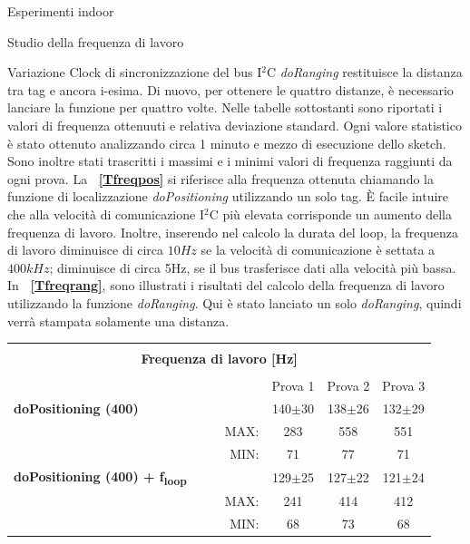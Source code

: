 \documentclass[12pt]{report}
\begin{document}
\begin{section}{Esperimenti indoor}
\begin{subsection}{Studio della frequenza di lavoro}
\begin{subsubsection}{Variazione Clock di sincronizzazione del bus I$^2$C}
			\textit{doRanging} restituisce la distanza tra tag e ancora i-esima. Di nuovo, per ottenere le quattro distanze, è necessario lanciare la funzione per quattro volte. 
			Nelle tabelle sottostanti sono riportati i valori di frequenza ottenuuti e relativa deviazione standard. Ogni valore statistico è stato ottenuto analizzando circa 1 minuto e mezzo di esecuzione dello sketch. Sono inoltre stati trascritti i massimi e i minimi valori di frequenza raggiunti da ogni prova.
			La \textbf{\tablename~\ref{Tfreqpos}} si riferisce alla frequenza ottenuta chiamando la funzione di localizzazione \textit{doPositioning} utilizzando un solo tag. È facile intuire che alla velocità di comunicazione I$^2$C più elevata corrisponde un aumento della frequenza di lavoro. Inoltre, inserendo nel calcolo la 			durata del loop, la frequenza di lavoro diminuisce di circa $10Hz$  se la velocità di comunicazione è settata a $400kHz$; diminuisce di circa 5Hz, se il bus trasferisce dati alla velocità più bassa. 			In \textbf{\tablename~\ref{Tfreqrang}}, sono illustrati i risultati del calcolo della frequenza di lavoro utilizzando la 			funzione \textit{doRanging}. Qui è stato lanciato un solo \textit{doRanging}, quindi verrà stampata solamente una distanza.
			\begin{table}[H]
				\centering
				\begin{tabular}{|lcc|r|c|c|c|}
					\hline
					\multicolumn{7}{|c|}{}\\
					\multicolumn{7}{|c|}{\textbf{\Large Frequenza di lavoro [Hz]}}\\
					\multicolumn{7}{|c|}{}\\
					\hline
					\multicolumn{4}{|l|}{}&																							Prova 1&					Prova 2&					Prova 3\\
					\hline
					{\textbf{doPositioning (400)}}&	 \multicolumn{3}{l|}{}&											140$\pm$30&			138$\pm$26&			132$\pm$29\\
					\hline
					 &	 & &							 MAX:&																					283&							558&							551\\
					\hline
					 &	 & &							 MIN:&																					71&							77&							71\\
					\hline
					{\textbf{doPositioning (400) + f\textsubscript{loop}}}&	 	\multicolumn{3}{l|}{}&		129$\pm$25&			127$\pm$22&			121$\pm$24\\
					\hline
					 &	 & &							 MAX:&																					241&							414&							412\\
					\hline
					 &	 & &							 MIN:&																					68&							73&							68\\

\end{tabular}
\end{table}
\end{subsubsection}
\end{subsection}
\end{section}
\end{document}
